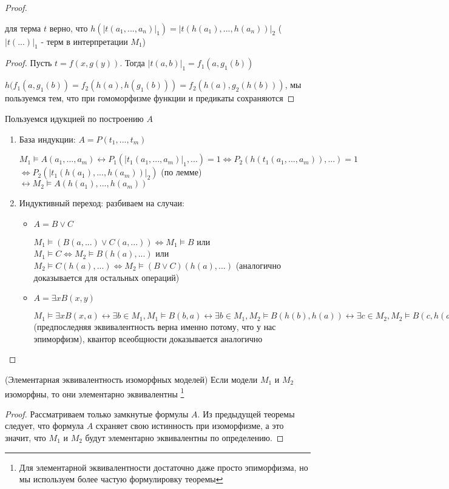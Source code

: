 \documentclass{article}
\begin{document}
\begin{proof}
    \begin{lemma}
        для терма $t$ верно, что $h(|t(a_1,..., a_n)|_1) = |t(h(a_1),..., h(a_n))|_2$ ($|t(...)|_1$ - терм в интерпретации $M_1$)
    \end{lemma}
    
    \begin{proof}
        Пусть $t = f(x, g(y))$. Тогда $|t(a,b)|_1 = f_1(a, g_1(b))$
        
        $h(f_1(a, g_1(b)) = f_2(h(a), h(g_1(b))) = f_2(h(a), g_2(h(b)))$, мы пользуемся тем, что при гомоморфизме функции и предикаты сохраняются
    \end{proof}
    
    Пользуемся идукцией по построению $A$
    \begin{enumerate}
        \item База индукции: $A = P(t_1,..., t_m)$
        
        $M_1 \vDash A(a_1,...,a_m) \leftrightarrow P_1(|t_1(a_1,..., a_m)|_1,...) = 1 \Leftrightarrow P_2(h(t_1(a_1,..., a_m)),...) = 1$\\
        $\Leftrightarrow P_2(|t_1(h(a_1),..., h(a_m))|_2)$ (по лемме) $\leftrightarrow M_2 \vDash A(h(a_1),..., h(a_m))$
        
        \item Индуктивный переход: разбиваем на случаи:
        \begin{itemize}
            \item $A = B \vee C$
            
            $M_1 \vDash (B(a,...) \vee C(a,...)) \Leftrightarrow M_1 \vDash B$ или $M_1 \vDash C \Leftrightarrow M_2 \vDash B(h(a),...)$ или $M_2 \vDash C(h(a),...) \Leftrightarrow M_2 \vDash (B \vee C)(h(a),...)$ (аналогично доказывается для остальных операций)
            \item $A = \exists x B(x, y)$
            
            $M_1 \vDash \exists x B(x, a) \leftrightarrow \exists b \in M_1, M_1 \vDash B(b, a) \leftrightarrow \exists b \in M_1, M_2 \vDash B(h(b), h(a)) \leftrightarrow \exists c \in M_2, M_2 \vDash B(c, h(a)) \leftrightarrow M_2 \vDash \exists x B(x, h(a))$ (предпоследняя эквивалентность верна именно потому, что у нас эпиморфизм), квантор всеобщности доказывается аналогично 
        \end{itemize}
    \end{enumerate}
\end{proof}

\begin{theorem}{(Элементарная эквивалентность изоморфных моделей)}
	Если модели $M_1$ и $M_2$ изоморфны, то они элементарно эквивалентны \footnote{Для элементарной эквивалентности достаточно даже просто эпиморфизма, но мы используем более частую формулировку теоремы}
\end{theorem}

\begin{proof}
    Рассматриваем только замкнутые формулы $A$. Из предыдущей теоремы следует, что формула $A$ схраняет свою истинность при изоморфизме, а это значит, что $M_1$ и $M_2$ будут элементарно эквивалентны по определению.
\end{proof}
\end{document}
